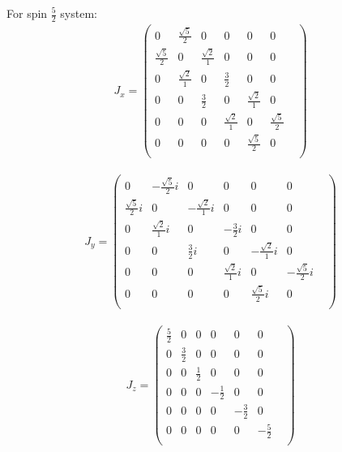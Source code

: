 \documentclass[10pt,a4paper]{article}
\begin{document}
For spin $\frac{5}{2}$ system:\begin{align}
J_x = \begin{pmatrix}
0&\frac{\sqrt{5}}{2}&0&0&0&0&\\\frac{\sqrt{5}}{2}&0&\frac{\sqrt{2}}{1}&0&0&0&\\0&\frac{\sqrt{2}}{1}&0&\frac{3}{2}&0&0&\\0&0&\frac{3}{2}&0&\frac{\sqrt{2}}{1}&0&\\0&0&0&\frac{\sqrt{2}}{1}&0&\frac{\sqrt{5}}{2}&\\0&0&0&0&\frac{\sqrt{5}}{2}&0&\\\end{pmatrix}\end{align}

\begin{align}
J_y = \begin{pmatrix}
0&-\frac{\sqrt{5}}{2}i&0&0&0&0&\\\frac{\sqrt{5}}{2}i&0&-\frac{\sqrt{2}}{1}i&0&0&0&\\0&\frac{\sqrt{2}}{1}i&0&-\frac{3}{2}i&0&0&\\0&0&\frac{3}{2}i&0&-\frac{\sqrt{2}}{1}i&0&\\0&0&0&\frac{\sqrt{2}}{1}i&0&-\frac{\sqrt{5}}{2}i&\\0&0&0&0&\frac{\sqrt{5}}{2}i&0&\\\end{pmatrix}\end{align}

\begin{align}
J_z = \begin{pmatrix}
\frac{5}{2}&0&0&0&0&0&\\0&\frac{3}{2}&0&0&0&0&\\0&0&\frac{1}{2}&0&0&0&\\0&0&0&-\frac{1}{2}&0&0&\\0&0&0&0&-\frac{3}{2}&0&\\0&0&0&0&0&-\frac{5}{2}&\\\end{pmatrix}\end{align}
\end{document}

